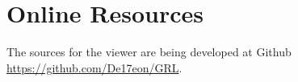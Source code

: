 \documentclass[
]{ceurart}
\begin{document}
\appendix

\section{Online Resources}

The sources for the viewer are being developed at Github
\url{https://github.com/De17eon/GRL}.
\end{document}

